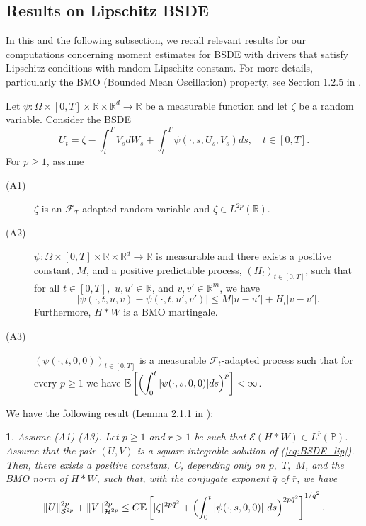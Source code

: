 \documentclass[12,english]{amsart}
\theoremstyle{plain}
\newtheorem{lem}{\protect\lemmaname}
\theoremstyle{definition}
\theoremstyle{plain}
\theoremstyle{plain}
\theoremstyle{remark}
\providecommand{\lemmaname}{Lemma}
\newcommand{\E}{\mathbb E}
\newcommand{\R}{\mathbb R}
\newcommand{\cE}{\mathcal E}
\newcommand{\cF}{\mathcal F}
\newcommand{\cH}{\mathcal H}
\newcommand{\cS}{\mathcal S}
\newcommand{\Om}{\Omega}
\begin{document}
\subsection{Results on Lipschitz BSDE}

In this and the following subsection, we recall relevant results for
our computations concerning moment 
estimates for BSDE with drivers that satisfy Lipschitz conditions
with random Lipschitz constant. For more details, particularly the
BMO (Bounded Mean Oscillation) property, see Section 1.2.5 in \cite{dos2010some}.

Let $\psi:\Om\times[0,T]\times\R\times\R^d\to\R$ be a measurable function and let $\zeta$ be a random
variable. Consider the BSDE
\begin{equation}
U_t=\zeta-\int_t^TV_sdW_s+\int_t^T\psi\left(\cdot,s,U_s,V_s\right)ds,\quad
t\in\left[0,T\right].\label{eq:BSDE_lip}
\end{equation}
For $p\geq1$, assume
\begin{description}
\item [(A1)] $\zeta$ is an $\cF_T$-adapted random variable
and $\zeta\in L^{2p}(\R)$.
\item [(A2)] $\psi:\Om\times[0,T]\times\R\times\R^d\to\R$
is measurable and there exists a positive constant, $M$,
and a positive predictable process, $(H_t)_{t\in[0,T]}$,
such that for all $t\in[0,T],$ $u,u'\in\R$, and
$v,v'\in\mathbb{R}^m$, we have
\begin{equation}
|\psi(\cdot,t,u,v)-\psi(\cdot,t,u',v')|\leq M|u-u'|+H_t|v-v'|.\label{eq:lm_bsde_a2}
\end{equation}
Furthermore, $H\ast W$ is a BMO martingale.
\item [(A3)] $\left(\psi\left(\cdot,t,0,0\right)\right)_{t\in\left[0,T\right]}$
is a measurable $\cF_t$-adapted process such that for every
$p\geq1$ we have $\displaystyle\E\left[\Bigl(\int_0^t|\psi(\cdot,s,0,0)|ds\Bigr)^{p}\right]<\infty$.
\end{description}

We have the following result (Lemma 2.1.1 in \cite{dos2010some}):
\begin{lem}
  \label{lem:Mom_bsde_lip}
  Assume (A1)-(A3). Let $p\geq1$ and $\bar{r}>1$
be such that $\cE(H\ast W)\in L^{\bar{r}}\left(\mathbb{P}\right)$.
Assume that the pair $(U,V)$ is a square integrable
solution of (\ref{eq:BSDE_lip}).
Then, there exists a positive constant, C, depending only on $p,$
$T,$ $M$, and the BMO norm of $H\ast W$, such that, with the conjugate
exponent $\bar{q}$ of $\bar{r}$, we have
\[
\|U\|_{\cS^{2p}}^{2p}+\|V\|_{\cH^{2p}}^{2p}\leq
C\E\left[|\zeta|^{2p\bar{q}^2}+\Bigl(\int_0^t|\psi(\cdot,s,0,0)|\
    ds\Bigr)^{2p\bar{q}^2}\right]^{1/q^2}.
\]
\end{lem}
\end{document}
